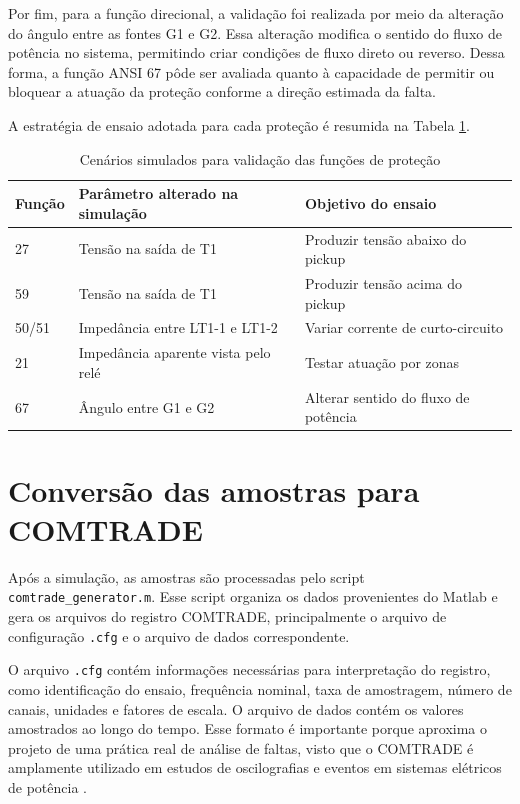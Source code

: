 Por fim, para a função direcional, a validação foi realizada por meio da alteração do ângulo entre as fontes G1 e G2. Essa alteração modifica o sentido do fluxo de potência no sistema, permitindo criar condições de fluxo direto ou reverso. Dessa forma, a função ANSI 67 pôde ser avaliada quanto à capacidade de permitir ou bloquear a atuação da proteção conforme a direção estimada da falta.

A estratégia de ensaio adotada para cada proteção é resumida na Tabela \ref{tab:cenarios-protecao}.

\begin{table}[H]
  \centering
  \small
  \caption{Cenários simulados para validação das funções de proteção}
  \label{tab:cenarios-protecao}
  \begin{tabular}{lll}
    \toprule
    Função & Parâmetro alterado na simulação & Objetivo do ensaio \\
    \midrule
    27 & Tensão na saída de T1 & Produzir tensão abaixo do pickup \\
    59 & Tensão na saída de T1 & Produzir tensão acima do pickup \\
    50/51 & Impedância entre LT1-1 e LT1-2 & Variar corrente de curto-circuito \\
    21 & Impedância aparente vista pelo relé & Testar atuação por zonas \\
    67 & Ângulo entre G1 e G2 & Alterar sentido do fluxo de potência \\
    \bottomrule
  \end{tabular}
\end{table}

\section{Conversão das amostras para COMTRADE}

Após a simulação, as amostras são processadas pelo script \texttt{comtrade\_generator.m}. Esse script organiza os dados provenientes do Matlab e gera os arquivos do registro COMTRADE, principalmente o arquivo de configuração \texttt{.cfg} e o arquivo de dados correspondente.

O arquivo \texttt{.cfg} contém informações necessárias para interpretação do registro, como identificação do ensaio, frequência nominal, taxa de amostragem, número de canais, unidades e fatores de escala. O arquivo de dados contém os valores amostrados ao longo do tempo. Esse formato é importante porque aproxima o projeto de uma prática real de análise de faltas, visto que o COMTRADE é amplamente utilizado em estudos de oscilografias e eventos em sistemas elétricos de potência \cite{ieee_comtrade,iec_60255_24_2013}.

